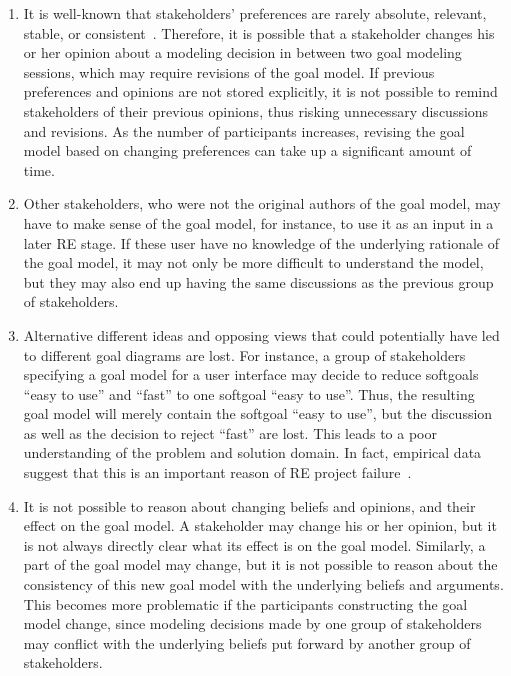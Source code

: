 
\begin{enumerate}
\item
It is well-known that stakeholders' preferences are rarely absolute, relevant, stable, or consistent~\cite{march1978bounded}. Therefore, it is possible that a stakeholder changes his or her opinion about a modeling decision in between two goal modeling sessions, which may require revisions of the goal model. If previous preferences and opinions are not stored explicitly, it is not possible to remind stakeholders of their previous opinions, thus risking unnecessary discussions and revisions. As the number of participants increases, revising the goal model based on changing preferences can take up a significant amount of time. 
\item
Other stakeholders, who were not the original authors of the goal model, may have to make sense of the goal model, for instance, to use it as an input in a later RE stage. If these user have no knowledge of the underlying rationale of the goal model, it may not only be more difficult to understand the model, but they may also end up having the same discussions as the previous group of stakeholders.
\item
Alternative different ideas and opposing views that could potentially have led to different goal diagrams are lost. For instance, a group of stakeholders specifying a goal model for a user interface may decide to reduce softgoals ``easy to use'' and ``fast'' to one softgoal ``easy to use''. Thus, the resulting goal model will merely contain the softgoal ``easy to use'', but the discussion as well as the decision to reject ``fast'' are lost. This leads to a poor understanding of the problem and solution domain. In fact, empirical data suggest that this is an important reason of RE project failure~\cite{curtis1988field}. 
\item
It is not possible to reason about changing beliefs and opinions, and their effect on the goal model. A stakeholder may change his or her opinion, but it is not always directly clear what its effect is on the goal model. Similarly, a part of the goal model may change, but it is not possible to reason about the consistency of this new goal model with the underlying beliefs and arguments. This becomes more problematic if the participants constructing the goal model change, since modeling decisions made by one group of stakeholders may conflict with the underlying beliefs put forward by another group of stakeholders.
\end{enumerate}
 

